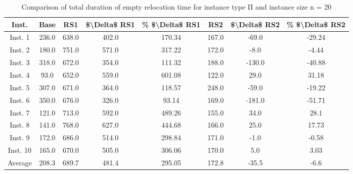 \begin{table}[H]
\centering
\begin{tabular}{cccccccc}
  \hline
  \textbf{Inst.} & \textbf{Base} & \textbf{RS1} & \textbf{\$\textbackslash{}Delta\$  RS1} & \textbf{\% \$\textbackslash{}Delta\$  RS1} & \textbf{RS2} & \textbf{\$\textbackslash{}Delta\$  RS2} & \textbf{\% \$\textbackslash{}Delta\$  RS2} \\\hline
  Inst. 1 & 236.0 & 638.0 & 402.0 & 170.34 & 167.0 & -69.0 & -29.24 \\
  Inst. 2 & 180.0 & 751.0 & 571.0 & 317.22 & 172.0 & -8.0 & -4.44 \\
  Inst. 3 & 318.0 & 672.0 & 354.0 & 111.32 & 188.0 & -130.0 & -40.88 \\
  Inst. 4 & 93.0 & 652.0 & 559.0 & 601.08 & 122.0 & 29.0 & 31.18 \\
  Inst. 5 & 307.0 & 671.0 & 364.0 & 118.57 & 248.0 & -59.0 & -19.22 \\
  Inst. 6 & 350.0 & 676.0 & 326.0 & 93.14 & 169.0 & -181.0 & -51.71 \\
  Inst. 7 & 121.0 & 713.0 & 592.0 & 489.26 & 155.0 & 34.0 & 28.1 \\
  Inst. 8 & 141.0 & 768.0 & 627.0 & 444.68 & 166.0 & 25.0 & 17.73 \\
  Inst. 9 & 172.0 & 686.0 & 514.0 & 298.84 & 171.0 & -1.0 & -0.58 \\
  Inst. 10 & 165.0 & 670.0 & 505.0 & 306.06 & 170.0 & 5.0 & 3.03 \\
  Average & 208.3 & 689.7 & 481.4 & 295.05 & 172.8 & -35.5 & -6.6 \\\hline
\end{tabular}
\caption{Comparison of total duration of empty relocation time for instance type II and instance size n = 20}
\label{tab:wait:resrelocation-empty-relocation-comparison_II_20}
\end{table}
